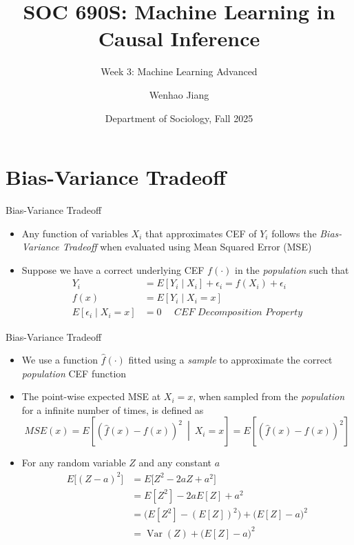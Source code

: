 \documentclass[aspectratio=1610,12pt,xcolor=dvipsnames]{beamer}
\title[CML]{SOC 690S: Machine Learning in Causal Inference\\[1.5pt]}
\subtitle{\large Week 3: Machine Learning Advanced\\[-10pt]}
\author[Jiang] 
{\large Wenhao Jiang\vspace{-2em}}
\institute[Duke]{}
\date[Duke]
{\large Department of Sociology, Fall 2025}
\begin{document}

\begin{frame}
    \titlepage 
\end{frame}

\begin{frame}{}
\vspace{-1.4em}
\setlength{\tabcolsep}{1pt}
{\footnotesize}
\end{frame}

\section{Bias-Variance Tradeoff}

\begin{frame}
  \sectionpage
\end{frame}

\begin{frame}{Bias-Variance Tradeoff}

\begin{itemize}
    \item Any function of variables $X_i$ that approximates CEF of $Y_i$ follows the \textit{Bias-Variance Tradeoff} when evaluated using Mean Squared Error (MSE)
    \item Suppose we have a correct underlying CEF $f(\cdot)$ in the \textit{population} such that
    \begin{align*}
    Y_i &= E[Y_i \mid X_i] + \epsilon_i = f(X_i) + \epsilon_i \\
    f(x) &= E[Y_i \mid X_i=x] \\ 
    E[\epsilon_i \mid X_i=x] &= 0 \quad \textit{ CEF Decomposition Property}
    \end{align*}
\end{itemize}
\end{frame}

\begin{frame}{Bias-Variance Tradeoff}

\begin{itemize}
    \item We use a function $\hat{f}(\cdot)$ fitted using a \textit{sample} to approximate the correct \textit{population} CEF function
    \item The point-wise expected MSE at $X_i = x$, when sampled from the \textit{population} for a infinite number of times, is defined as 
    $$\textit{MSE}(x) = E\left[\left(\hat{f}(x) - f(x)\right)^2 \:\middle|\: X_i=x \right] = E\left[\left(\hat{f}(x) - f(x)\right)^2 \right]$$ \pause
    \item For any random variable $Z$ and any constant $a$
    \begin{align*}
    E\big[(Z-a)^2\big]
    &= E\big[Z^2 - 2aZ + a^2\big] \\
    &= E[Z^2] - 2aE[Z] + a^2 \\
    &= \big(E[Z^2] - (E[Z])^2\big) + \big(E[Z]-a\big)^2 \\
    &= \operatorname{Var}(Z) + \big(E[Z]-a\big)^2
\end{align*}
\end{itemize}
\end{frame}
\end{document}
